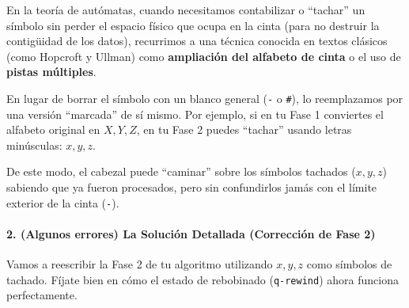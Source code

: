 \documentclass[12pt]{book} %
\begin{document}
En la teoría de autómatas, cuando necesitamos contabilizar o ``tachar''
un símbolo sin perder el espacio físico que ocupa en la cinta (para no
destruir la contigüidad de los datos), recurrimos a una técnica conocida
en textos clásicos (como Hopcroft y Ullman) como \textbf{ampliación del
alfabeto de cinta} o el uso de \textbf{pistas múltiples}.

En lugar de borrar el símbolo con un blanco general (\texttt{-} o
\texttt{\#}), lo reemplazamos por una versión ``marcada'' de sí mismo.
Por ejemplo, si en tu Fase 1 conviertes el alfabeto original en
\(X, Y, Z\), en tu Fase 2 puedes ``tachar'' usando letras minúsculas:
\(x, y, z\).

De este modo, el cabezal puede ``caminar'' sobre los símbolos tachados
(\(x, y, z\)) sabiendo que ya fueron procesados, pero sin confundirlos
jamás con el límite exterior de la cinta (\texttt{-}).

\hypertarget{algunos-errores-la-soluciuxf3n-detallada-correcciuxf3n-de-fase-2}{%
\paragraph{2. (Algunos errores) La Solución Detallada (Corrección de
Fase
2)}\label{algunos-errores-la-soluciuxf3n-detallada-correcciuxf3n-de-fase-2}}

Vamos a reescribir la Fase 2 de tu algoritmo utilizando \(x, y, z\) como
símbolos de tachado. Fíjate bien en cómo el estado de rebobinado
(\texttt{q-rewind}) ahora funciona perfectamente.
\end{document}
